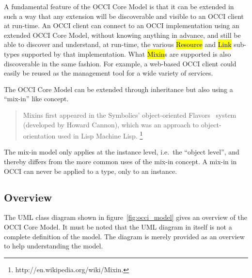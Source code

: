 \documentclass[10pt,a4paper]{article}
\begin{document}
A fundamental feature of the OCCI Core Model is that it can be extended in such a
way that any extension will be discoverable and visible to an OCCI client at
run-time. An OCCI client can connect to an OCCI implementation using an
extended OCCI Core Model, without knowing anything in advance, and still be
able to discover and understand, at run-time, the various \hl{Resource} and \hl{Link} sub-types
supported by that implementation. What \hl{Mixin}s are supported is also discoverable in the 
same fashion. For example, a web-based OCCI client could easily be reused as the 
management tool for a wide variety of services.

The OCCI Core Model can be extended through inheritance but also
using a ``mix-in'' like concept.
\begin{quote}
Mixins first appeared in the Symbolics' 
object-oriented Flavors~\cite{Moon:1986:flavors}
system (developed by Howard Cannon), which was an 
approach to object-orientation used in Lisp Machine Lisp.%
\footnote{http://en.wikipedia.org/wiki/Mixin.}
\end{quote}
%
The mix-in model only applies at the instance
level, i.e.~the ``object level'', and thereby differs from the more common uses
of the mix-in concept. A mix-in in OCCI can never be applied to a type, only to
an instance.

\subsection{Overview}

The UML class diagram shown in figure~\ref{fig:occi_model} gives an overview of
the OCCI Core Model. It must be noted that the UML diagram in itself is not a
complete definition of the model. The diagram is merely provided as an overview
to help understanding the model. 
\end{document}
